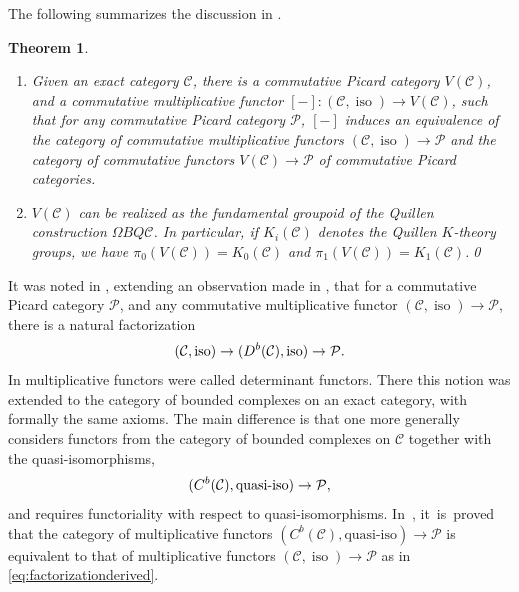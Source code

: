 \documentclass[JEP,XML,SOM,Unicode,published]{cedram}
\theoremstyle{plain}
\newtheorem{theorem}{Theorem}[section]
\theoremstyle{definition}
\newcommand{\Ccal}{\mathcal C}
\newcommand{\Pcal}{\mathcal P}
\DeclareMathOperator{\iso}{iso}
\begin{document}
The following summarizes the discussion in \cite[]{Deligne-determinant}.

\skpt
\begin{theorem}\label{thm:delignevirtual}
\begin{enumerate}
\item Given an exact category $\Ccal$, there is a commutative Picard category $V(\Ccal)$, and a commutative multiplicative functor $[-]\colon(\Ccal, \iso) \to V(\Ccal)$, such that for any commutative Picard category $\Pcal$, $[-]$ induces an equivalence of the category of commutative multiplicative functors $(\Ccal, \iso) \to \Pcal$ and the category of commutative functors $V(\Ccal) \to \Pcal$ of commutative Picard categories.
\item $V(\Ccal)$ can be realized as the fundamental groupoid of the Quillen construction $\Omega BQ\Ccal$. In particular, if $K_i(\Ccal)$ denotes the Quillen $K$-theory groups, we have $\pi_0(V(\Ccal)) = K_0(\Ccal)$ and $\pi_1(V(\Ccal)) = K_1(\Ccal)$.\qed
\end{enumerate}
\end{theorem}

It was noted in \cite[]{Deligne-determinant}, extending an observation made in \cite{KnudsenMumford}, that for a commutative Picard category $\Pcal$, and any commutative multiplicative functor $(\Ccal, \iso) \to \Pcal$, there is a natural factorization\vspace*{-3pt}
\begin{equation}\label{eq:factorizationderived}
(\Ccal, \iso) \to (D^b(\Ccal), \hbox{iso}) \to \Pcal.
\end{equation}
In \cite{Knudsen} multiplicative functors were called determinant functors. There this notion was extended to the category of bounded complexes on an exact category, with formally the same axioms. The main difference is that one more generally considers functors from the category of bounded complexes on $\Ccal$ together with the quasi-isomorphisms,
\begin{displaymath}
(C^b(\Ccal), \hbox{quasi-iso}) \to \Pcal,
\end{displaymath}
and requires functoriality with respect to quasi-isomorphisms. In~\cite[Th.\,2.3]{Knudsen}, it~is~proved that the category of multiplicative functors \hbox{$(C^b(\Ccal), \text{quasi-iso})\!\to\! \Pcal$} is equivalent to that of multiplicative functors $(\Ccal, \iso) \to \Pcal$ as in \eqref{eq:factorizationderived}.
\end{document}
